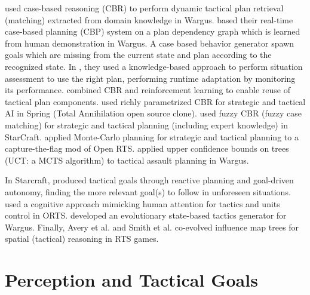 \cite{LTW} used case-based reasoning (CBR) to perform dynamic tactical plan retrieval (matching) extracted from domain knowledge in Wargus. \cite{Ontanon2007} based their real-time case-based planning (CBP) system on a plan dependency graph which is learned from human demonstration in Wargus. A case based behavior generator spawn goals which are missing from the current state and plan according to the recognized state. In \citep{Mishra2008,metalevelbehavioradaptrts}, they used a knowledge-based approach to perform situation assessment to use the right plan, performing runtime adaptation by monitoring its performance. \cite{CBR-RL} combined CBR and reinforcement learning to enable reuse of tactical plan components. 
\cite{Bakkes09} used richly parametrized CBR for strategic and tactical AI in Spring (Total Annihilation open source clone). 
\cite{CadenaG11} used fuzzy CBR (fuzzy case matching) for strategic and tactical planning (including expert knowledge) in StarCraft. \cite{Chung05} applied Monte-Carlo planning for strategic and tactical planning to a capture-the-flag mod of Open RTS. \cite{UCT} applied upper confidence bounds on trees (UCT: a MCTS algorithm) to tactical assault planning in Wargus. 

In Starcraft, \cite{Weber2010cr,WeberCIG10} produced tactical goals through reactive planning and goal-driven autonomy, finding the more relevant goal(s) to follow in unforeseen situations. 
\cite{SORTS} used a cognitive approach mimicking human attention for tactics and units control in ORTS. \cite{PonsenMSA06} developed an evolutionary state-based tactics generator for Wargus. %
Finally, Avery et al. \cite{Avery09} and Smith et al. \cite{SmithCIG10} co-evolved influence map trees for spatial (tactical) reasoning in RTS games. 

\section{Perception and Tactical Goals}
